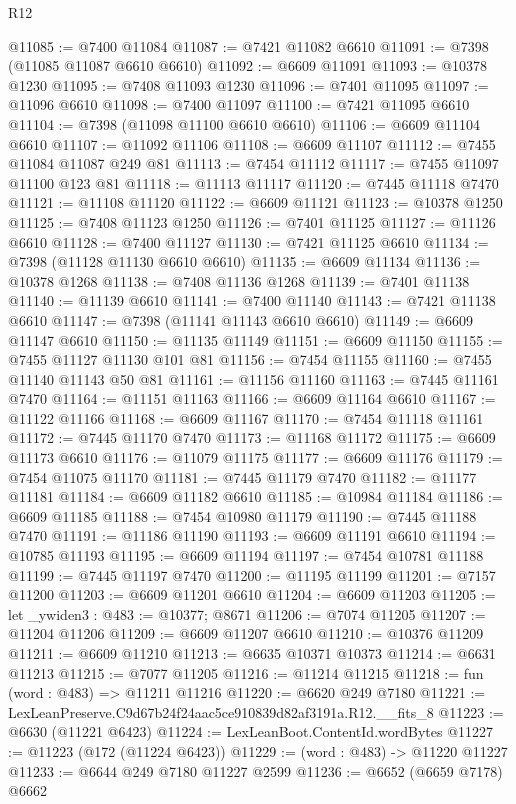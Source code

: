 \begin{lexlean}{R12}
\begin{coremodule}
@11085 := @7400 @11084
@11087 := @7421 @11082 @6610
@11091 := @7398 (@11085 @11087 @6610 @6610)
@11092 := @6609 @11091
@11093 := @10378 @1230
@11095 := @7408 @11093 @1230
@11096 := @7401 @11095
@11097 := @11096 @6610
@11098 := @7400 @11097
@11100 := @7421 @11095 @6610
@11104 := @7398 (@11098 @11100 @6610 @6610)
@11106 := @6609 @11104 @6610
@11107 := @11092 @11106
@11108 := @6609 @11107
@11112 := @7455 @11084 @11087 @249 @81
@11113 := @7454 @11112
@11117 := @7455 @11097 @11100 @123 @81
@11118 := @11113 @11117
@11120 := @7445 @11118 @7470
@11121 := @11108 @11120
@11122 := @6609 @11121
@11123 := @10378 @1250
@11125 := @7408 @11123 @1250
@11126 := @7401 @11125
@11127 := @11126 @6610
@11128 := @7400 @11127
@11130 := @7421 @11125 @6610
@11134 := @7398 (@11128 @11130 @6610 @6610)
@11135 := @6609 @11134
@11136 := @10378 @1268
@11138 := @7408 @11136 @1268
@11139 := @7401 @11138
@11140 := @11139 @6610
@11141 := @7400 @11140
@11143 := @7421 @11138 @6610
@11147 := @7398 (@11141 @11143 @6610 @6610)
@11149 := @6609 @11147 @6610
@11150 := @11135 @11149
@11151 := @6609 @11150
@11155 := @7455 @11127 @11130 @101 @81
@11156 := @7454 @11155
@11160 := @7455 @11140 @11143 @50 @81
@11161 := @11156 @11160
@11163 := @7445 @11161 @7470
@11164 := @11151 @11163
@11166 := @6609 @11164 @6610
@11167 := @11122 @11166
@11168 := @6609 @11167
@11170 := @7454 @11118 @11161
@11172 := @7445 @11170 @7470
@11173 := @11168 @11172
@11175 := @6609 @11173 @6610
@11176 := @11079 @11175
@11177 := @6609 @11176
@11179 := @7454 @11075 @11170
@11181 := @7445 @11179 @7470
@11182 := @11177 @11181
@11184 := @6609 @11182 @6610
@11185 := @10984 @11184
@11186 := @6609 @11185
@11188 := @7454 @10980 @11179
@11190 := @7445 @11188 @7470
@11191 := @11186 @11190
@11193 := @6609 @11191 @6610
@11194 := @10785 @11193
@11195 := @6609 @11194
@11197 := @7454 @10781 @11188
@11199 := @7445 @11197 @7470
@11200 := @11195 @11199
@11201 := @7157 @11200
@11203 := @6609 @11201 @6610
@11204 := @6609 @11203
@11205 := let _ywiden3 : @483 := @10377; @8671
@11206 := @7074 @11205
@11207 := @11204 @11206
@11209 := @6609 @11207 @6610
@11210 := @10376 @11209
@11211 := @6609 @11210
@11213 := @6635 @10371 @10373
@11214 := @6631 @11213
@11215 := @7077 @11205
@11216 := @11214 @11215
@11218 := fun (word : @483) => @11211 @11216
@11220 := @6620 @249 @7180
@11221 := LexLeanPreserve.C9d67b24f24aac5ce910839d82af3191a.R12.__fits_8
@11223 := @6630 (@11221 @6423)
@11224 := LexLeanBoot.ContentId.wordBytes
@11227 := @11223 (@172 (@11224 @6423))
@11229 := (word : @483) -> @11220 @11227
@11233 := @6644 @249 @7180 @11227 @2599
@11236 := @6652 (@6659 @7178) @6662

\end{coremodule}
\end{lexlean}

